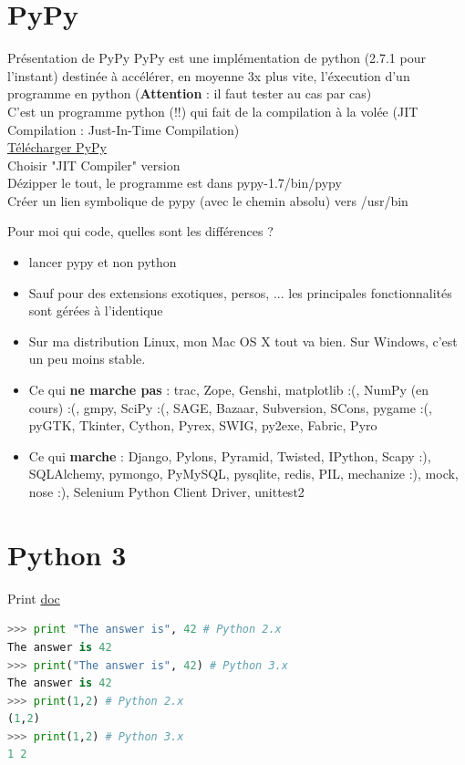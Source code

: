 \documentclass{beamer}
\begin{document}
\section{PyPy}

\begin{frame}[fragile]{Présentation de PyPy}
PyPy est une implémentation de python (2.7.1 pour l'instant) destinée à accélérer, en moyenne 3x plus vite, l'éxecution d'un programme en python (\textbf{Attention} : il faut tester au cas par cas)\\
C'est un programme python (!!) qui fait de la compilation à la volée (JIT Compilation : Just-In-Time Compilation)\\
\href{http://pypy.org/download.html}{Télécharger PyPy}\\
Choisir "JIT Compiler" version\\
Dézipper le tout, le programme est dans pypy-1.7/bin/pypy\\
Créer un lien symbolique de pypy (avec le chemin absolu) vers /usr/bin
\end{frame}


\begin{frame}[fragile]{Pour moi qui code, quelles sont les différences ?}
\begin{itemize}
 \item lancer pypy et non python
 \item Sauf pour des extensions exotiques, persos, ... les principales fonctionnalités sont gérées à l'identique
 \item Sur ma distribution Linux, mon Mac OS X tout va bien. Sur Windows, c'est un peu moins stable.
 \item Ce qui \textbf{ne marche pas} : \small trac, Zope, Genshi, matplotlib :(, NumPy (en cours) :(, gmpy, SciPy :(, SAGE, Bazaar, Subversion, SCons, pygame :(, pyGTK, Tkinter, Cython, Pyrex, SWIG, py2exe, Fabric, Pyro
 \item Ce qui \textbf{marche} : \small Django, Pylons, Pyramid, Twisted, IPython, Scapy :), SQLAlchemy, pymongo, PyMySQL, pysqlite, redis, PIL, mechanize :), mock, nose :), Selenium Python Client Driver, unittest2
\end{itemize}
\end{frame}


\section{Python 3}

\begin{frame}[fragile]{Print}
\href{http://docs.python.org/release/3.0.1/whatsnew/3.0.html}{doc}


\begin{lstlisting}[language=python]
>>> print "The answer is", 42 # Python 2.x
The answer is 42
>>> print("The answer is", 42) # Python 3.x
The answer is 42
>>> print(1,2) # Python 2.x
(1,2)
>>> print(1,2) # Python 3.x
1 2
\end{lstlisting}

\end{frame}
\end{document}

